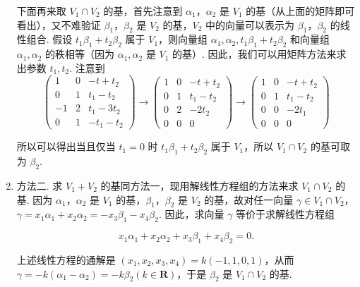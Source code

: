 \begin{solution}
\begin{enumerate}
        下面再来取 $V_1\cap V_2$ 的基，首先注意到 $\alpha_1$，$\alpha_2$ 是 $V_1$ 的基（从上面的矩阵即可看出），又不难验证 $\beta_1$，$\beta_2$ 是 $V_2$ 的基，$V_2$ 中的向量可以表示为 $\beta_1$，$\beta_2$ 的线性组合. 假设 $t_1\beta_1 + t_2\beta_2$ 属于 $V_1$，则向量组 $\alpha_1, \alpha_2, t_1\beta_1 + t_2\beta_2$ 和向量组 $\alpha_1, \alpha_2$ 的秩相等（因为 $\alpha_1, \alpha_2$ 是 $V_1$ 的基）. 因此，我们可以用矩阵方法来求出参数 $t_1, t_2$. 注意到
        \[ \begin{pmatrix}
                1 & 0 & -t + t_2  \\
                0 & 1 & t_1 - t_2 \\
                -1 & 2 & t_1 - 3t_2 \\
                0 & 1 & -t_1 - t_2
        \end{pmatrix} \xrightarrow{} \begin{pmatrix}
                1 & 0 & -t + t_2  \\
                0 & 1 & t_1 - t_2 \\
                0 & 2 & -2t_2 \\
                0 & 0 & 0
        \end{pmatrix} \xrightarrow{} \begin{pmatrix}
                1 & 0 & -t + t_2  \\
                0 & 1 & t_1 - t_2 \\
                0 & 0 & -2t_1 \\
                0 & 0 & 0
        \end{pmatrix} \]

        所以可以得出当且仅当 $t_1 = 0$ 时 $t_1\beta_1 + t_2\beta_2$ 属于 $V_1$，所以 $V_1 \cap V_2$ 的基可取为 $\beta_2$.

        \item 方法二. 求 $V_1 + V_2$ 的基同方法一，现用解线性方程组的方法来求 $V_1 \cap V_2$ 的基. 因为 $\alpha_1$，$\alpha_2$ 是 $V_1$ 的基，$\beta_1$，$\beta_2$ 是 $V_2$ 的基，故对任一向量 $\gamma \in V_1 \cap V_2$，$\gamma = x_1\alpha_1 + x_2\alpha_2 = -x_3\beta_1 - x_4\beta_2$. 因此，求向量 $\gamma$ 等价于求解线性方程组

        \[ x_1\alpha_1 + x_2\alpha_2 + x_3\beta_1 + x_4\beta_2 = 0. \]

        上述线性方程的通解是 $(x_1, x_2, x_3, x_4) = k(-1, 1, 0, 1)$，从而 $\gamma = -k(\alpha_1 - \alpha_2) = -k\beta_2 (k \in \mathbf{R})$，于是 $\beta_2$ 是 $V_1 \cap V_2$ 的基.
    \end{enumerate}
\end{solution}

